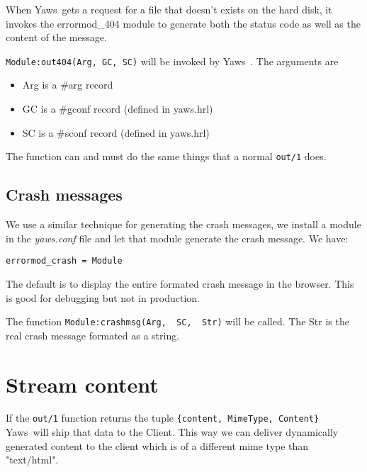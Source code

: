 \documentclass[11pt,oneside,english]{book}
\newcommand{\Yaws}            %
        {{\sc Yaws}}
\begin{document}
When \Yaws\  gets a request for  a file that doesn't exists
on the hard disk, it invokes the errormod\_404 module
to generate both the status code as well as the content of the
message.

        \verb+Module:out404(Arg, GC, SC)+ will
                   be invoked by \Yaws\ . The arguments are

\begin{itemize}
\item              Arg is a \#arg{} record

\item              GC  is  a  \#gconf{}   record   (defined   in
              yaws.hrl)

\item              SC   is   a   \#sconf{}  record  (defined  in
              yaws.hrl)
\end{itemize}

              The function can and must do the same things
              that a normal \verb+out/1+ does.




  \subsection{Crash messages}

We use a similar technique for generating the crash messages, we
install a module in the \textit{yaws.conf} file and let that module generate
the crash message.
We have:
\begin{verbatim}
errormod_crash = Module
\end{verbatim}

The  default  is  to  display the
entire  formated  crash   message   in   the
browser.  This is good for debugging but not
in production.

The function \verb+Module:crashmsg(Arg,  SC,  Str)+
will  be  called.  The Str is the real crash
message formated as a string.



\section{Stream content}

If the \verb+out/1+ function returns the tuple
\verb+{content, MimeType, Content}+ \Yaws\  will
ship that data to the Client. This way we can
deliver dynamically generated content to the client
which is of a different mime type than "text/html".
\end{document}
